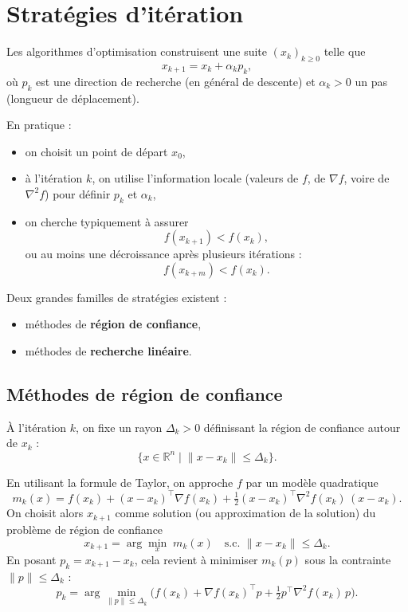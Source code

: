 \section{Stratégies d’itération}
\label{sec:2.3}

Les algorithmes d’optimisation construisent une suite $(x_k)_{k\ge 0}$ telle que
\[
    x_{k+1} = x_k + \alpha_k p_k,
\]
où $p_k$ est une direction de recherche (en général de descente) et $\alpha_k > 0$
un pas (longueur de déplacement).

En pratique :
\begin{itemize}
    \item on choisit un point de départ $x_0$,
    \item à l’itération $k$, on utilise l’information locale (valeurs de $f$, de
    $\nabla f$, voire de $\nabla^2 f$) pour définir $p_k$ et $\alpha_k$,
    \item on cherche typiquement à assurer
    \[
        f(x_{k+1}) < f(x_k),
    \]
    ou au moins une décroissance après plusieurs itérations :
    \[
        f(x_{k+m}) < f(x_k).
    \]
\end{itemize}

Deux grandes familles de stratégies existent :
\begin{itemize}
    \item méthodes de \textbf{région de confiance},
    \item méthodes de \textbf{recherche linéaire}.
\end{itemize}

\subsection{Méthodes de région de confiance}
\label{subsec:2.3.1}

À l’itération $k$, on fixe un rayon $\Delta_k > 0$ définissant la région de confiance
autour de $x_k$ :
\[
    \{x \in \mathbb{R}^n \;|\; \|x - x_k\| \le \Delta_k\}.
\]

En utilisant la formule de Taylor, on approche $f$ par un modèle quadratique
\begin{equation}
    m_k(x) = f(x_k) + (x-x_k)^\top \nabla f(x_k)
             + \tfrac{1}{2}(x-x_k)^\top \nabla^2 f(x_k)\,(x-x_k).
\end{equation}
On choisit alors $x_{k+1}$ comme solution (ou approximation de la solution)
du problème de région de confiance
\begin{equation}
    x_{k+1} = \arg\min_{x} \; m_k(x)
    \quad \text{s.c. } \|x - x_k\| \le \Delta_k.
\end{equation}
En posant $p_k = x_{k+1} - x_k$, cela revient à minimiser $m_k(p)$ sous la
contrainte $\|p\| \le \Delta_k$ :
\begin{equation}
    p_k = \arg\min_{\|p\| \le \Delta_k}
    \Big( f(x_k) + \nabla f(x_k)^\top p
          + \tfrac{1}{2}p^\top \nabla^2 f(x_k)\,p \Big).
\end{equation}

